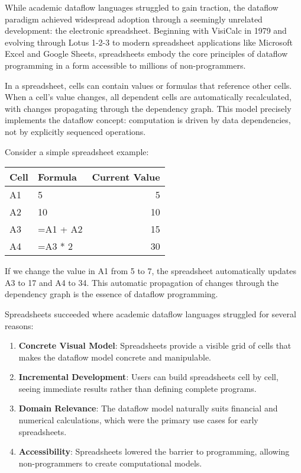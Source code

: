 \documentclass[11pt]{article}
\begin{document}
While academic dataflow languages struggled to gain traction, the dataflow paradigm achieved widespread adoption through a seemingly unrelated development: the electronic spreadsheet. Beginning with VisiCalc in 1979 and evolving through Lotus 1-2-3 to modern spreadsheet applications like Microsoft Excel and Google Sheets, spreadsheets embody the core principles of dataflow programming in a form accessible to millions of non-programmers.

In a spreadsheet, cells can contain values or formulas that reference other cells. When a cell's value changes, all dependent cells are automatically recalculated, with changes propagating through the dependency graph. This model precisely implements the dataflow concept: computation is driven by data dependencies, not by explicitly sequenced operations.

Consider a simple spreadsheet example:

\begin{center}
\begin{tabular}{llr}
Cell & Formula & Current Value\\
\hline
A1 & 5 & 5\\
A2 & 10 & 10\\
A3 & =A1 + A2 & 15\\
A4 & =A3 * 2 & 30\\
\end{tabular}
\end{center}

If we change the value in A1 from 5 to 7, the spreadsheet automatically updates A3 to 17 and A4 to 34. This automatic propagation of changes through the dependency graph is the essence of dataflow programming.

Spreadsheets succeeded where academic dataflow languages struggled for several reasons:

\begin{enumerate}
\item \textbf{Concrete Visual Model}: Spreadsheets provide a visible grid of cells that makes the dataflow model concrete and manipulable.

\item \textbf{Incremental Development}: Users can build spreadsheets cell by cell, seeing immediate results rather than defining complete programs.

\item \textbf{Domain Relevance}: The dataflow model naturally suits financial and numerical calculations, which were the primary use cases for early spreadsheets.

\item \textbf{Accessibility}: Spreadsheets lowered the barrier to programming, allowing non-programmers to create computational models.
\end{enumerate}
\end{document}
